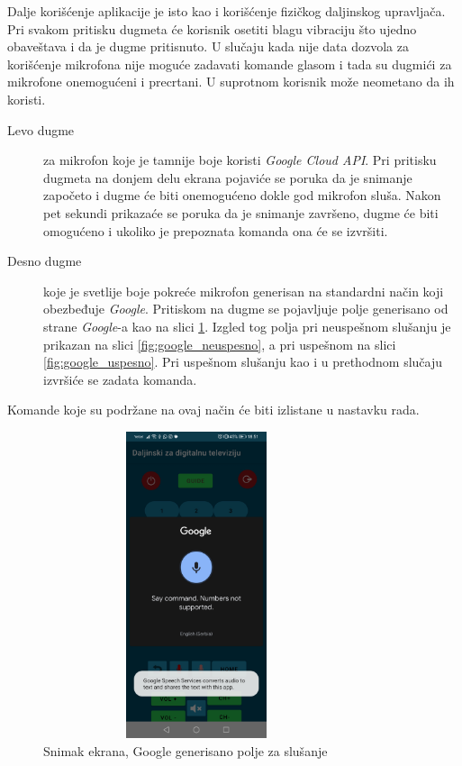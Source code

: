 \documentclass[implementacija.tex]{subfiles}
\begin{document}
Dalje korišćenje aplikacije je isto kao i korišćenje fizičkog daljinskog upravljača. Pri svakom pritisku dugmeta će korisnik osetiti blagu vibraciju što ujedno obaveštava i da je dugme pritisnuto. U slučaju kada nije data dozvola za korišćenje mikrofona nije moguće zadavati komande glasom i tada su dugmići za mikrofone onemogućeni i precrtani. U suprotnom korisnik može neometano da ih koristi.
\begin{description}
\item[Levo dugme] za mikrofon koje je tamnije boje koristi \textit{Google Cloud API}. Pri pritisku dugmeta na donjem delu ekrana pojaviće se poruka da je snimanje započeto i dugme će biti onemogućeno dokle god mikrofon sluša. Nakon pet sekundi prikazaće se poruka da je snimanje završeno, dugme će biti omogućeno i ukoliko je prepoznata komanda ona će se izvršiti.
\item[Desno dugme] koje je svetlije boje pokreće mikrofon generisan na standardni način koji obezbeđuje \textit{Google}. Pritiskom na dugme se pojavljuje polje generisano od strane \textit{Google}-a kao na slici \ref{fig:google_slusanje}. Izgled tog polja pri neuspešnom slušanju je prikazan na slici \ref{fig:google_neuspesno}, a pri uspešnom na slici \ref{fig:google_uspesno}. Pri uspešnom slušanju kao i u prethodnom slučaju izvršiće se zadata komanda.
\end{description}
Komande koje su podržane na ovaj način će biti izlistane u nastavku rada.  

\begin{figure}[h!]
  \centering
  \includegraphics[width=9cm,height=9cm,keepaspectratio]{Implementacija/snimci_ekrana/10_obican_google_slusanje.jpg}
  \caption{Snimak ekrana, Google generisano polje za slušanje}
   \label{fig:google_slusanje}
\end{figure}
\end{document}
